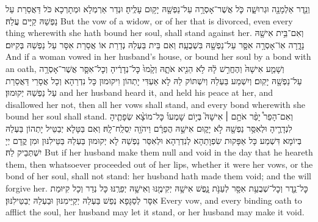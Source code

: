 {וְנֵ֥דֶר אַלְמָנָ֖ה וּגְרוּשָׁ֑ה כֹּ֛ל אֲשֶׁר־אָסְרָ֥ה עַל־נַפְשָׁ֖הּ יָק֥וּם עָלֶֽיהָ׃
}
{וּנְדַר אַרְמְלָא וּמְתָרְכָא כֹּל דַּאֲסַרַת עַל נַפְשַׁהּ קַיָּים עֲלַהּ׃}
{But the vow of a widow, or of her that is divorced, even every thing wherewith she hath bound her soul, shall stand against her.}{}
{וְאִם־בֵּ֥ית אִישָׁ֖הּ נָדָ֑רָה אֽוֹ־אָסְרָ֥ה אִסָּ֛ר עַל־נַפְשָׁ֖הּ בִּשְׁבֻעָֽה׃
}
{וְאִם בֵּית בַּעְלַהּ נְדַרַת אוֹ אֲסַרַת אִסָּר עַל נַפְשַׁהּ בְּקִיּוּם׃}
{And if a woman vowed in her husband’s house, or bound her soul by a bond with an oath,}{}
{וְשָׁמַ֤ע אִישָׁהּ֙ וְהֶחֱרִ֣שׁ לָ֔הּ לֹ֥א הֵנִ֖יא אֹתָ֑הּ וְקָ֙מוּ֙ כׇּל־נְדָרֶ֔יהָ וְכׇל־אִסָּ֛ר אֲשֶׁר־אָסְרָ֥ה עַל־נַפְשָׁ֖הּ יָקֽוּם׃}
{וְיִשְׁמַע בַּעְלַהּ וְיִשְׁתּוֹק לַהּ לָא אַעְדִּי יָתְהוֹן וִיקוּמוּן כָּל נִדְרַהָא וְכָל אֲסָרֵי דַּאֲסַרַת עַל נַפְשַׁהּ יְקוּמוּן׃}
{and her husband heard it, and held his peace at her, and disallowed her not, then all her vows shall stand, and every bond wherewith she bound her soul shall stand.}{}
{וְאִם־הָפֵר֩ יָפֵ֨ר אֹתָ֥ם \small ׀\normalsize  אִישָׁהּ֮ בְּי֣וֹם שׇׁמְעוֹ֒ כׇּל־מוֹצָ֨א שְׂפָתֶ֧יהָ לִנְדָרֶ֛יהָ וּלְאִסַּ֥ר נַפְשָׁ֖הּ לֹ֣א יָק֑וּם אִישָׁ֣הּ הֲפֵרָ֔ם וַיהֹוָ֖ה יִֽסְלַֽח־לָֽהּ׃}
{וְאִם בַּטָּלָא יְבַטֵּיל יָתְהוֹן בַּעְלַהּ בְּיוֹמָא דִּשְׁמַע כָּל אַפָּקוּת שִׂפְוָתַהָא לְנִדְרַהָא וּלְאִסַּר נַפְשַׁהּ לָא יְקוּמוּן בַּעְלַהּ בַּטֵּילִנּוּן וּמִן קֳדָם יְיָ יִשְׁתְּבֵיק לַהּ׃}
{But if her husband make them null and void in the day that he heareth them, then whatsoever proceeded out of her lips, whether it were her vows, or the bond of her soul, shall not stand: her husband hath made them void; and the \lord\space will forgive her.}{}
{כׇּל־נֵ֛דֶר וְכׇל־שְׁבֻעַ֥ת אִסָּ֖ר לְעַנֹּ֣ת נָ֑פֶשׁ אִישָׁ֥הּ יְקִימֶ֖נּוּ וְאִישָׁ֥הּ יְפֵרֶֽנּוּ׃
}
{כָּל נְדַר וְכָל קִיּוּמַת אִסָּר לְסַגָּפָא נְפַשׁ בַּעְלַהּ יְקַיֵּימִנּוּן וּבַעְלַהּ יְבַטֵּילִנּוּן׃}
{Every vow, and every binding oath to afflict the soul, her husband may let it stand, or her husband may make it void.}{}
